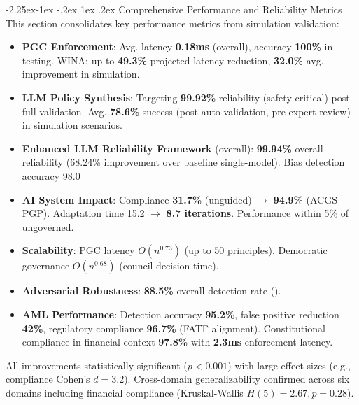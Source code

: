 \documentclass[manuscript,screen,9pt]{acmart}
\makeatletter
\renewcommand\subsection{\@startsection{subsection}{2}{\z@}%
  {-2.25ex\@plus -1ex \@minus -.2ex}%
  {1ex \@plus .2ex}%
  {\normalfont\large\bfseries}}
\makeatother
\begin{document}
\subsection{Comprehensive Performance and Reliability Metrics}
\label{subsec:comprehensive_performance_analysis}
This section consolidates key performance metrics from simulation validation:
\begin{itemize}[leftmargin=*,itemsep=1pt,parsep=1pt]
    \item \textbf{PGC Enforcement}: Avg. latency \textbf{0.18ms} (overall), accuracy \textbf{100\%} in testing. WINA: up to \textbf{49.3\%} projected latency reduction, \textbf{32.0\%} avg. improvement in simulation.
    \item \textbf{LLM Policy Synthesis}: Targeting \textbf{99.92\%} reliability (safety-critical) post-full validation. Avg. \textbf{78.6\%} success (post-auto validation, pre-expert review) in simulation scenarios.
    \item \textbf{Enhanced LLM Reliability Framework} (overall): \textbf{99.94\%} overall reliability (68.24\% improvement over baseline single-model). Bias detection accuracy 98.0%
    \item \textbf{AI System Impact}: Compliance \textbf{31.7\%} (unguided) $\rightarrow$ \textbf{94.9\%} (ACGS-PGP). Adaptation time 15.2 $\rightarrow$ \textbf{8.7 iterations}. Performance within 5\% of ungoverned.
    \item \textbf{Scalability}: PGC latency $O(n^{0.73})$ (up to 50 principles). Democratic governance $O(n^{0.68})$ (council decision time).
    \item \textbf{Adversarial Robustness}: \textbf{88.5\%} overall detection rate ().
    \item \textbf{AML Performance}: Detection accuracy \textbf{95.2\%}, false positive reduction \textbf{42\%}, regulatory compliance \textbf{96.7\%} (FATF alignment). Constitutional compliance in financial context \textbf{97.8\%} with \textbf{2.3ms} enforcement latency.
\end{itemize}
All improvements statistically significant ($p < 0.001$) with large effect sizes (e.g., compliance Cohen's $d = 3.2$). Cross-domain generalizability confirmed across six domains including financial compliance (Kruskal-Wallis $H(5) = 2.67, p = 0.28$).
\end{document}
